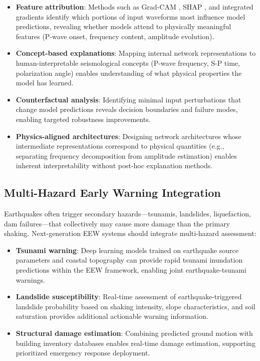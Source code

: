 \documentclass[review,authoryear]{elsarticle}
\begin{document}
\begin{itemize}
\item \textbf{Feature attribution}: Methods such as Grad-CAM \citep{selvaraju2017gradcam}, SHAP \citep{lundberg2017unified}, and integrated gradients identify which portions of input waveforms most influence model predictions, revealing whether models attend to physically meaningful features (P-wave onset, frequency content, amplitude evolution).
\item \textbf{Concept-based explanations}: Mapping internal network representations to human-interpretable seismological concepts (P-wave frequency, S-P time, polarization angle) enables understanding of what physical properties the model has learned.
\item \textbf{Counterfactual analysis}: Identifying minimal input perturbations that change model predictions reveals decision boundaries and failure modes, enabling targeted robustness improvements.
\item \textbf{Physics-aligned architectures}: Designing network architectures whose intermediate representations correspond to physical quantities (e.g., separating frequency decomposition from amplitude estimation) enables inherent interpretability without post-hoc explanation methods.
\end{itemize}

\subsection{Multi-Hazard Early Warning Integration}

Earthquakes often trigger secondary hazards---tsunamis, landslides, liquefaction, dam failures---that collectively may cause more damage than the primary shaking. Next-generation EEW systems should integrate multi-hazard assessment:

\begin{itemize}
\item \textbf{Tsunami warning}: Deep learning models trained on earthquake source parameters and coastal topography can provide rapid tsunami inundation predictions within the EEW framework, enabling joint earthquake-tsunami warnings.
\item \textbf{Landslide susceptibility}: Real-time assessment of earthquake-triggered landslide probability based on shaking intensity, slope characteristics, and soil saturation provides additional actionable warning information.
\item \textbf{Structural damage estimation}: Combining predicted ground motion with building inventory databases enables real-time damage estimation, supporting prioritized emergency response deployment.
\end{itemize}
\end{document}
